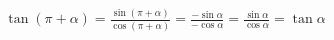 \documentclass[preview]{standalone}
\begin{document}
\begin{align*}
\tan(\pi+\alpha) = \frac{\sin(\pi+\alpha)}{\cos(\pi+\alpha)} = \frac{-\sin\alpha}{-\cos\alpha} = \frac{\sin\alpha}{\cos\alpha} = \tan\alpha
\end{align*}
\end{document}
